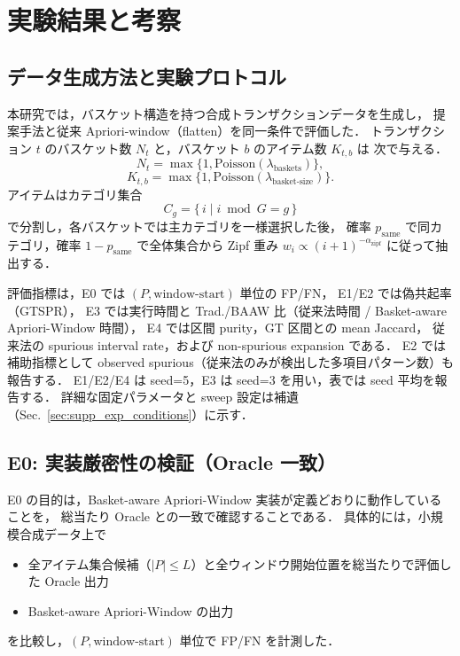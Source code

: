 \section{実験結果と考察}
\label{sec:experiments}

\subsection{データ生成方法と実験プロトコル}
\label{sec:exp_method}

本研究では，バスケット構造を持つ合成トランザクションデータを生成し，
提案手法と従来 Apriori-window（flatten）を同一条件で評価した．
トランザクション $t$ のバスケット数 $N_t$ と，バスケット $b$ のアイテム数 $K_{t,b}$ は
次で与える．
\[
N_t = \max\{1, \mathrm{Poisson}(\lambda_{\text{baskets}})\},
\]
\[
K_{t,b} = \max\{1, \mathrm{Poisson}(\lambda_{\text{basket-size}})\}.
\]
アイテムはカテゴリ集合
\[
C_g = \{\,i \mid i \bmod G = g\,\}
\]
で分割し，各バスケットでは主カテゴリを一様選択した後，
確率 $p_{\text{same}}$ で同カテゴリ，確率 $1-p_{\text{same}}$ で全体集合から
Zipf 重み $w_i \propto (i+1)^{-\alpha_{\text{zipf}}}$ に従って抽出する．

評価指標は，E0 では $(P,\text{window-start})$ 単位の FP/FN，
E1/E2 では偽共起率（GTSPR），
E3 では実行時間と Trad./BAAW 比（従来法時間 / Basket-aware Apriori-Window 時間），
E4 では区間 purity，GT 区間との mean Jaccard，
従来法の spurious interval rate，および non-spurious expansion である．
E2 では補助指標として observed spurious（従来法のみが検出した多項目パターン数）も報告する．
E1/E2/E4 は seed=5，E3 は seed=3 を用い，表では seed 平均を報告する．
詳細な固定パラメータと sweep 設定は補遺（Sec.~\ref{sec:supp_exp_conditions}）に示す．

\subsection{E0: 実装厳密性の検証（Oracle 一致）}
\label{sec:exp_e0}

E0 の目的は，Basket-aware Apriori-Window 実装が定義どおりに動作していることを，
総当たり Oracle との一致で確認することである．
具体的には，小規模合成データ上で
\begin{itemize}
    \item 全アイテム集合候補（$|P| \le L$）と全ウィンドウ開始位置を総当たりで評価した Oracle 出力
    \item Basket-aware Apriori-Window の出力
\end{itemize}
を比較し，$(P,\text{window-start})$ 単位で FP/FN を計測した．

